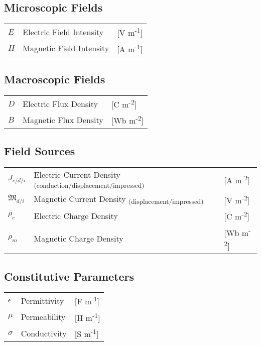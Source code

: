\documentclass{article}
\numberwithin{equation}{section}
\begin{document}
\subsection*{Microscopic Fields}
\begin{tabular}{ m{7em} m{24em} m{4em} }
    \( E \) & Electric Field Intensity & [V m\textsuperscript{-1}] \\
    \( H \) & Magnetic Field Intensity & [A m\textsuperscript{-1}] \\
\end{tabular}
\subsection*{Macroscopic Fields}
\begin{tabular}{ m{7em} m{24em} m{4em} }
    \( D \) & Electric Flux Density & [C m\textsuperscript{-2}] \\
    \( B \) & Magnetic Flux Density & [Wb m\textsuperscript{-2}] \\
\end{tabular}
\subsection*{Field Sources}
\begin{tabular}{ m{7em} m{24em} m{4em} }
    \( \displaystyle J_{c/d/i} \) & Electric Current Density \textsubscript{(conduction/displacement/impressed)} & [A m\textsuperscript{-2}] \\
    \( \displaystyle \mathfrak{M}_{d/i} \) & Magnetic Current Density \textsubscript{(displacement/impressed)} & [V m\textsuperscript{-2}] \\
    \( \displaystyle \rho_{e} \) & Electric Charge Density & [C m\textsuperscript{-2}] \\
    \( \displaystyle \rho_{m} \) & Magnetic Charge Density & [Wb m\textsuperscript{-2}] \\
\end{tabular}
\subsection*{Constitutive Parameters}
\begin{tabular}{ m{7em} m{24em} m{4em} }
    \( \displaystyle \epsilon \) & Permittivity & [F m\textsuperscript{-1}] \\
    \( \displaystyle \mu \) & Permeability & [H m\textsuperscript{-1}] \\
    \( \displaystyle \sigma \) & Conductivity & [S m\textsuperscript{-1}] \\
\end{tabular}
\end{document}
